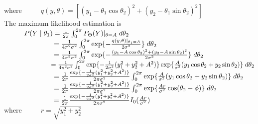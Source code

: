 \documentclass[]{article}
\begin{document}
where $\hspace{1cm}q(y,\theta) = [(y_{1} - \theta_{1}\cos\theta_{2})^{2} + (y_{2} - \theta_{1}\sin\theta_{2})^{2}]$\\

The maximum likelihood estimation is\\

$\hspace{1cm} P(Y\mid \theta_{1}) = \frac{1}{2\pi} \int_{0}^{2\pi} P_{\Theta}(Y) \arrowvert_{\theta = A}\;d\theta_{2}$\\

$\hspace{2.5cm} = \frac{1}{4\pi^{2} \sigma^{2}} \int_{0}^{2\pi} \exp\{-\frac{q(y,\theta)\arrowvert_{\theta_{1}=A}}{2\sigma^{2}}\} \;d\theta_{2}$\\

$\hspace{2.5cm} = \frac{1}{4\pi^{2} \sigma^{2}} \int_{0}^{2\pi} \exp\{-\frac{(y_{1} - A\cos\theta_{2})^{2} + (y_{2} - A\sin\theta_{2})^{2}}{2\sigma^{2}}\} \;d\theta_{2}$\\

$\hspace{2.5cm} = \frac{1}{4\pi^{2} \sigma^{2}} \int_{0}^{2\pi} \exp\{-\frac{1}{2\sigma^{2}}(y_{1}^{2} + y_{2}^{2} + A^{2})\} \exp\{\frac{A}{\sigma^{2}}(y_{1}\cos\theta_{2} + y_{2}\sin \theta_{2})\} \;d\theta_{2}$\\

$\hspace{2.5cm} = \frac{1}{2\pi} \frac{\exp\{-\frac{1}{2\sigma^{2}}(y_{1}^{2} + y_{2}^{2} + A^{2})\}}{2\pi \sigma^{2}} \int_{0}^{2\pi} \exp\{\frac{A}{\sigma^{2}}(y_{1}\cos\theta_{2} + y_{2}\sin \theta_{2})\} \;d\theta_{2} $\\

$\hspace{2.5cm} = \frac{1}{2\pi} \frac{\exp\{-\frac{1}{2\sigma^{2}}(y_{1}^{2} + y_{2}^{2} + A^{2})\}}{2\pi \sigma^{2}}  \int_{0}^{2\pi}\exp \{\frac{Ar}{\sigma^{2}}\cos(\theta_{2} - \phi)\} \;d\theta_{2} $\\

$\hspace{2.5cm} = \frac{1}{2\pi} \frac{\exp\{-\frac{1}{2\sigma^{2}}(y_{1}^{2} + y_{2}^{2} + A^{2})\}}{2\pi \sigma^{2}} I_0(\frac{Ar}{\sigma^{2}})$\\

where $\hspace{1cm} r = \sqrt{y_{1}^{2} + y_{2}^{2}}$\\
\end{document}
